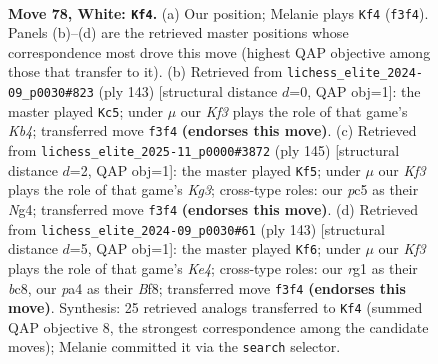 \documentclass[11pt]{article}
\begin{document}
\clearpage

\begin{figure}[p]\centering
\begin{subfigure}{0.46\textwidth}\centering
\resizebox{\linewidth}{!}{%
\newchessgame
\chessboard[
  setfen={8/4k3/8/2pp4/p7/5K2/8/6r1 w - - 12 78},
  showmover=false,
  pgfstyle=straightmove, color=movearrow, markmove={f3-f4}
]}
\caption{}
\end{subfigure}\hfill
\begin{subfigure}{0.46\textwidth}\centering
\resizebox{\linewidth}{!}{%
\newchessgame
\chessboard[
  setfen={8/5P2/8/1k1P2P1/7R/3K4/8/8 b - - 0 72},
  showmover=false,
  pgfstyle=straightmove, color=movearrow, markmove={b5-c5}
]}
\caption{}
\end{subfigure}
\\[4pt]
\begin{subfigure}{0.46\textwidth}\centering
\resizebox{\linewidth}{!}{%
\newchessgame
\chessboard[
  setfen={8/R7/3K2k1/8/1P1P2n1/8/8/8 b - - 4 73},
  showmover=false,
  pgfstyle=straightmove, color=movearrow, markmove={g6-f5}
]}
\caption{}
\end{subfigure}\hfill
\begin{subfigure}{0.46\textwidth}\centering
\resizebox{\linewidth}{!}{%
\newchessgame
\chessboard[
  setfen={2B2b2/8/1P4P1/4k3/8/3K4/8/8 b - - 0 72},
  showmover=false,
  pgfstyle=straightmove, color=movearrow, markmove={e5-f6}
]}
\caption{}
\end{subfigure}
\caption{\textbf{Move 78, White: \texttt{Kf4}.} (a) Our position; Melanie plays \texttt{Kf4} (\texttt{f3f4}). Panels (b)--(d) are the retrieved master positions whose correspondence most drove this move (highest QAP objective among those that transfer to it). (b) Retrieved from \texttt{lichess\_elite\_2024-09\_p0030\#823} (ply 143) [structural distance $d$=0, QAP obj=1]: the master played \texttt{Kc5}; under $\mu$ our \emph{Kf3} plays the role of that game's \emph{Kb4}; transferred move \texttt{f3f4} \textbf{(endorses this move)}. (c) Retrieved from \texttt{lichess\_elite\_2025-11\_p0000\#3872} (ply 145) [structural distance $d$=2, QAP obj=1]: the master played \texttt{Kf5}; under $\mu$ our \emph{Kf3} plays the role of that game's \emph{Kg3}; cross-type roles: our \emph{p}c5 as their \emph{N}g4; transferred move \texttt{f3f4} \textbf{(endorses this move)}. (d) Retrieved from \texttt{lichess\_elite\_2024-09\_p0030\#61} (ply 143) [structural distance $d$=5, QAP obj=1]: the master played \texttt{Kf6}; under $\mu$ our \emph{Kf3} plays the role of that game's \emph{Ke4}; cross-type roles: our \emph{r}g1 as their \emph{b}c8, our \emph{p}a4 as their \emph{B}f8; transferred move \texttt{f3f4} \textbf{(endorses this move)}. Synthesis: 25 retrieved analogs transferred to \texttt{Kf4} (summed QAP objective 8, the strongest correspondence among the candidate moves); Melanie committed it via the \texttt{search} selector.}
\label{fig:thought-m154}
\end{figure}
\end{document}
